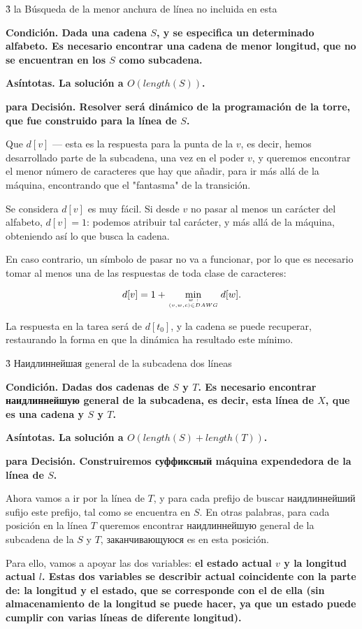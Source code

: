 \h3{ la Búsqueda de la menor anchura de línea no incluida en esta }

\bf{Condición}. Dada una cadena $S$, y se especifica un determinado alfabeto. Es necesario encontrar una cadena de menor longitud, que no se encuentran en los $S$ como subcadena.

\bf{Asíntotas}. La solución a $O (length (S))$.

\bf{para Decisión}. Resolver será dinámico de la programación de la torre, que fue construido para la línea de $S$.

Que $d[v]$ --- esta es la respuesta para la punta de la $v$, es decir, hemos desarrollado parte de la subcadena, una vez en el poder $v$, y queremos encontrar el menor número de caracteres que hay que añadir, para ir más allá de la máquina, encontrando que el "fantasma" de la transición.

Se considera $d[v]$ es muy fácil. Si desde $v$ no pasar al menos un carácter del alfabeto, $d[v] = 1$: podemos atribuir tal carácter, y más allá de la máquina, obteniendo así lo que busca la cadena.

En caso contrario, un símbolo de pasar no va a funcionar, por lo que es necesario tomar al menos una de las respuestas de toda clase de caracteres:

$$ d[v] = 1 + \min_{w ~ : \atop (v,w,c) \in DAWG} d[w]. $$

La respuesta en la tarea será de $d[t_0]$, y la cadena se puede recuperar, restaurando la forma en que la dinámica ha resultado este mínimo.


\h3{ Наидлиннейшая general de la subcadena dos líneas }

\bf{Condición}. Dadas dos cadenas de $S$ y $T$. Es necesario encontrar наидлиннейшую general de la subcadena, es decir, esta línea de $X$, que es una cadena y $S$ y $T$.

\bf{Asíntotas}. La solución a $O (length(S) + length(T))$.

\bf{para Decisión}. Construiremos суффиксный máquina expendedora de la línea de $S$.

Ahora vamos a ir por la línea de $T$, y para cada prefijo de buscar наидлиннейший sufijo este prefijo, tal como se encuentra en $S$. En otras palabras, para cada posición en la línea $T$ queremos encontrar наидлиннейшую general de la subcadena de la $S$ y $T$, заканчивающуюся es en esta posición.

Para ello, vamos a apoyar las dos variables: \bf{el estado actual} $v$ y \bf{la longitud actual} $l$. Estas dos variables se describir actual coincidente con la parte de: la longitud y el estado, que se corresponde con el de ella (sin almacenamiento de la longitud se puede hacer, ya que un estado puede cumplir con varias líneas de diferente longitud).


